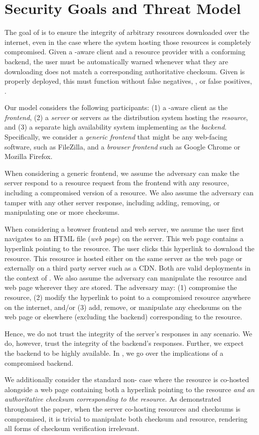 \section{Security Goals and Threat Model} \label{sec:model}

The goal of \SYSTEM{} is to ensure the integrity of arbitrary resources
downloaded over the internet, even in the case where the system hosting those
resources is completely compromised. Given a \SYSTEM{}-aware client and a
resource provider with a conforming backend, the user must be automatically
warned whenever what they are downloading does not match a corresponding
authoritative checksum. Given \SYSTEM{} is properly deployed, this must function
without false negatives, , or false positives, .

Our model considers the following participants: (1) a \SYSTEM{}-aware client as
the \emph{frontend}, (2) a \emph{server} or servers as the distribution system
hosting the \emph{resource}, and (3) a separate high availability system
implementing \SYSTEM{} as the \emph{backend}. Specifically, we consider a
\emph{generic frontend} that might be any web-facing software, such as
FileZilla, and a \emph{browser frontend} such as Google Chrome or Mozilla
Firefox.

When considering a generic frontend, we assume the adversary can make the server
respond to a resource request from the frontend with any resource, including a
compromised version of a resource. We also assume the adversary can tamper with
any other server response, including adding, removing, or manipulating one or
more checksums.

When considering a browser frontend and web server, we assume the user first
navigates to an HTML file (\emph{web page}) on the server. This web page
contains a hyperlink pointing to the resource. The user clicks this hyperlink to
download the resource. This resource is hosted either on the same server as the
web page or externally on a third party server such as a CDN. Both are valid
deployments in the context of \SYSTEM{}. We also assume the adversary can
manipulate the resource and web page wherever they are stored. The adversary
may: (1) compromise the resource, (2) modify the hyperlink to point to a
compromised resource anywhere on the internet, and/or (3) add, remove, or
manipulate any checksums on the web page or elsewhere (excluding the backend)
corresponding to the resource.

Hence, we do not trust the integrity of the server's responses in any scenario.
We do, however, trust the integrity of the backend's responses. Further, we
expect the backend to be highly available. In , we go over
the implications of a compromised backend.

We additionally consider the standard non-\SYSTEM{} case where the resource is
co-hosted alongside a web page containing both a hyperlink pointing to the
resource \emph{and an authoritative checksum corresponding to the resource}. As
demonstrated throughout the paper, when the server co-hosting resources and
checksums is compromised, it is trivial to manipulate both checksum and
resource, rendering all forms of checksum verification irrelevant.
